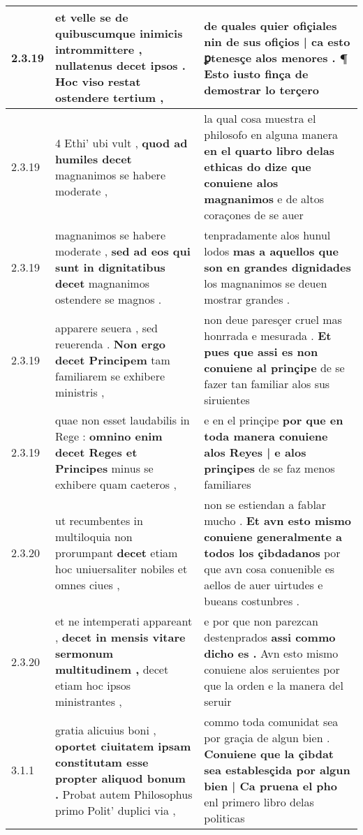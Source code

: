 \begin{tabular}{|p{1cm}|p{6.5cm}|p{6.5cm}|}
2.3.19 & et velle se de quibuscumque inimicis intrommittere , \textbf{ nullatenus decet ipsos . Hoc viso restat } ostendere tertium , & de quales quier ofiçiales \textbf{ nin de sus ofiçios | ca esto ꝑtenesçe alos menores . } ¶ Esto iusto finça de demostrar lo terçero \\\hline
2.3.19 & 4 Ethi’ ubi vult , \textbf{ quod ad humiles decet } magnanimos se habere moderate , & la qual cosa muestra el philosofo en alguna manera \textbf{ en el quarto libro delas ethicas do dize que conuiene alos magnanimos } e de altos coraçones de se auer \\\hline
2.3.19 & magnanimos se habere moderate , \textbf{ sed ad eos qui sunt in dignitatibus decet } magnanimos ostendere se magnos . & tenpradamente alos hunul lodos \textbf{ mas a aquellos que son en grandes dignidades } los magnanimos se deuen mostrar grandes . \\\hline
2.3.19 & apparere seuera , sed reuerenda . \textbf{ Non ergo decet Principem } tam familiarem se exhibere ministris , & non deue paresçer cruel mas honrrada e mesurada . \textbf{ Et pues que assi es non conuiene al prinçipe } de se fazer tan familiar alos sus siruientes \\\hline
2.3.19 & quae non esset laudabilis in Rege : \textbf{ omnino enim decet Reges et Principes } minus se exhibere quam caeteros , & e en el prinçipe \textbf{ por que en toda manera conuiene alos Reyes | e alos prinçipes } de se faz menos familiares \\\hline
2.3.20 & ut recumbentes in multiloquia non prorumpant \textbf{ decet } etiam hoc uniuersaliter nobiles et omnes ciues , & non se estiendan a fablar mucho . \textbf{ Et avn esto mismo conuiene generalmente a todos los çibdadanos } por que avn cosa conuenible es aellos de auer uirtudes e bueans costunbres . \\\hline
2.3.20 & et ne intemperati appareant , \textbf{ decet in mensis vitare sermonum multitudinem , } decet etiam hoc ipsos ministrantes , & e por que non parezcan destenprados \textbf{ assi commo dicho es . } Avn esto mismo conuiene alos seruientes por que la orden e la manera del seruir \\\hline
3.1.1 & gratia alicuius boni , \textbf{ oportet ciuitatem ipsam constitutam esse propter aliquod bonum . } Probat autem Philosophus primo Polit’ duplici via , & commo toda comunidat sea por graçia de algun bien . \textbf{ Conuiene que la çibdat sea establesçida por algun bien | Ca pruena el pho } enl primero libro delas politicas \\\hline

\end{tabular}
